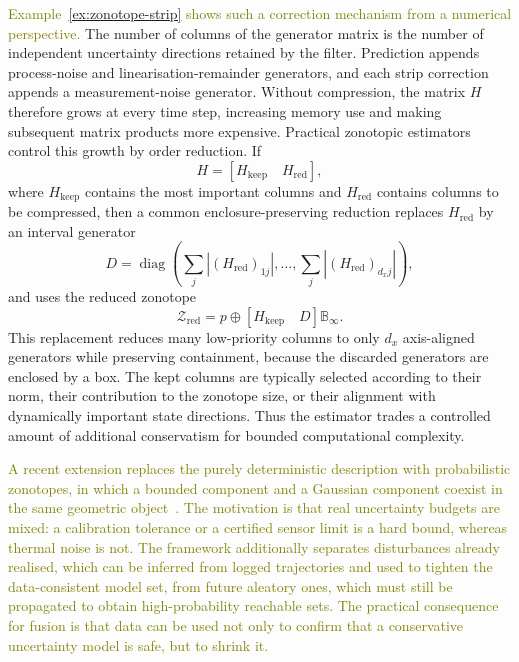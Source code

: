 \documentclass[11pt,oneside,openany]{book}
\begin{document}
\textcolor{olive}{Example~\ref{ex:zonotope-strip} shows such a correction mechanism from a numerical perspective.} The number of columns of the generator matrix is the number of independent uncertainty directions retained by the filter. Prediction appends process-noise and linearisation-remainder generators, and each strip correction appends a measurement-noise generator. Without compression, the matrix $H$ therefore grows at every time step, increasing memory use and making subsequent matrix products more expensive. Practical zonotopic estimators control this growth by order reduction. If
\begin{equation}
H=\left[H_{\mathrm{keep}}\quad H_{\mathrm{red}}\right],
\end{equation}
where $H_{\mathrm{keep}}$ contains the most important columns and $H_{\mathrm{red}}$ contains columns to be compressed, then a common enclosure-preserving reduction replaces $H_{\mathrm{red}}$ by an interval generator
\begin{equation}
D=\operatorname{diag}\!\left(\sum_j |(H_{\mathrm{red}})_{1j}|,\ldots,
\sum_j |(H_{\mathrm{red}})_{d_xj}|\right),
\end{equation}
and uses the reduced zonotope
\begin{equation}
\mathcal{Z}_{\mathrm{red}}
=
p\oplus
\left[H_{\mathrm{keep}}\quad D\right]\mathbb{B}_{\infty}.
\end{equation}
This replacement reduces many low-priority columns to only $d_x$ axis-aligned generators while preserving containment, because the discarded generators are enclosed by a box. The kept columns are typically selected according to their norm, their contribution to the zonotope size, or their alignment with dynamically important state directions. Thus the estimator trades a controlled amount of additional conservatism for bounded computational complexity.


\textcolor{olive}{A recent extension replaces the purely deterministic description with probabilistic zonotopes, in which a bounded component and a Gaussian component coexist in the same geometric object~\cite{modares2026reachability}. The motivation is that real uncertainty budgets are mixed: a calibration tolerance or a certified sensor limit is a hard bound, whereas thermal noise is not. The framework additionally separates disturbances already realised, which can be inferred from logged trajectories and used to tighten the data-consistent model set, from future aleatory ones, which must still be propagated to obtain high-probability reachable sets. The practical consequence for fusion is that data can be used not only to confirm that a conservative uncertainty model is safe, but to shrink it.}
\end{document}
